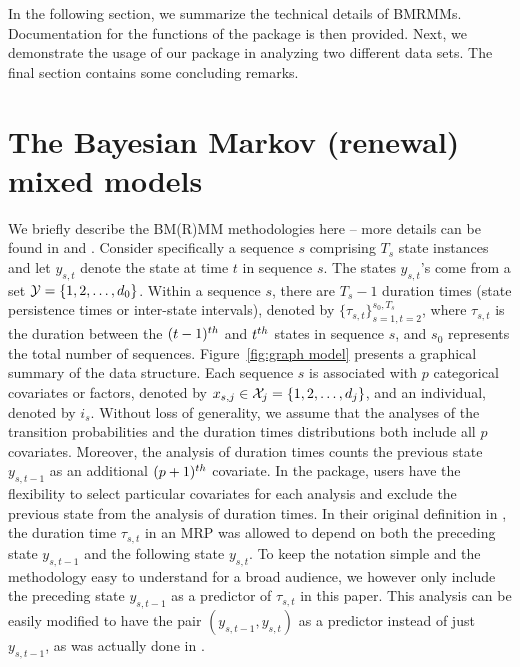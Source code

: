  




 

In the following section, we summarize the technical details of BMRMMs. 
Documentation for the functions of the   package is then provided. 
Next, we demonstrate the usage of our package in analyzing two different data sets. 
The final section contains some concluding remarks.



\vspace*{-6pt}
\section{The Bayesian Markov (renewal) mixed models} \label{sec:models}
\vspace*{-4pt}
We briefly describe the BM(R)MM methodologies here -- more details can be found in \citet{sarkar2018bayesian} and \citet{wu2021bayesian}. 
Consider specifically a sequence $s$ comprising $T_s$ state instances and let $y_{s,t}$ denote the state at time $t$ in sequence $s$. 
The states $y_{s,t}$'s come from a set ${\cal Y} = \{1,2,\dots,d_0\}$.
Within a sequence $s$, there are $T_s-1$ {duration times (state persistence times or inter-state intervals)}, 
denoted by $\{\tau_{s,t}\}_{s=1,t=2}^{s_0,T_s}$, where $\tau_{s,t}$ is the {duration} between the $(t-1)^{th}$ and $t^{th}$ states in sequence $s$, and $s_0$ represents the total number of sequences.
Figure~\ref{fig:graph model} presents a graphical summary of the data structure. 
Each sequence $s$ is associated with $p$ categorical covariates or factors, denoted by $x_{s,j} \in {\cal X}_j = \{1,2,\dots,d_j\}$, and an individual, denoted by $i_{s}$. 
Without loss of generality, we assume that the analyses of the transition probabilities and the {duration times} distributions both include all $p$ covariates. 
Moreover, the analysis of {duration times} counts the previous state $y_{s,t-1}$ as an additional $(p+1)^{th}$ covariate. 
In the  package, users have the flexibility to select particular covariates for each analysis and exclude the previous state from the analysis of duration times.  
In their original definition in \cite{pyke1961markov}, the duration time $\tau_{s,t}$ in an MRP was allowed to depend on both the preceding state $y_{s,t-1}$ and the following state $y_{s,t}$.
To keep the notation simple and the methodology easy to understand for a broad audience, we however only include the preceding state $y_{s,t-1}$ as a predictor of $\tau_{s,t}$ in this paper.
This analysis can be easily modified to  have the pair $(y_{s,t-1}, y_{s,t})$ as a predictor instead of just $y_{s,t-1}$, as was actually done in \cite{wu2021bayesian}.

